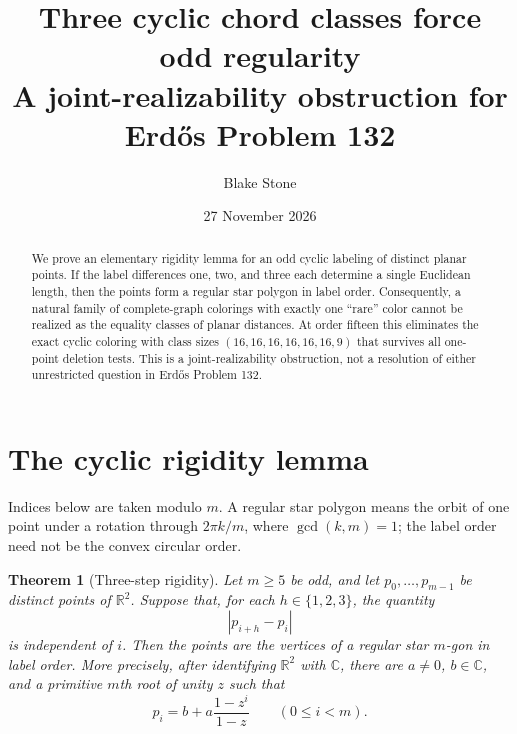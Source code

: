 \documentclass[11pt]{article}
\title{Three cyclic chord classes force odd regularity\\
\large A joint-realizability obstruction for Erd\H{o}s Problem 132}
\author{Blake Stone}
\date{27 November 2026}
\newtheorem{theorem}{Theorem}
\newcommand{\R}{\mathbb R}
\begin{document}
\maketitle

\begin{abstract}
We prove an elementary rigidity lemma for an odd cyclic labeling of distinct
planar points.  If the label differences one, two, and three each determine
a single Euclidean length, then the points form a regular star polygon in
label order.  Consequently, a natural family of complete-graph colorings
with exactly one ``rare'' color cannot be realized as the equality classes
of planar distances.  At order fifteen this eliminates the exact cyclic
coloring with class sizes $(16,16,16,16,16,16,9)$ that survives all
one-point deletion tests.  This is a joint-realizability obstruction, not a
resolution of either unrestricted question in Erd\H{o}s Problem 132.
\end{abstract}

\section{The cyclic rigidity lemma}

Indices below are taken modulo $m$.  A regular star polygon means the orbit
of one point under a rotation through $2\pi k/m$, where $\gcd(k,m)=1$;
the label order need not be the convex circular order.

\begin{theorem}[Three-step rigidity]\label{thm:rigidity}
Let $m\ge5$ be odd, and let $p_0,\ldots,p_{m-1}$ be distinct points of
$\R^2$.  Suppose that, for each $h\in\{1,2,3\}$, the quantity
\[
  |p_{i+h}-p_i|
\]
is independent of $i$.  Then the points are the vertices of a regular star
$m$-gon in label order.  More precisely, after identifying $\R^2$ with
$\mathbb C$, there are $a\ne0$, $b\in\mathbb C$, and a primitive $m$th
root of unity $z$ such that
\[
  p_i=b+a\frac{1-z^i}{1-z}\qquad(0\le i<m).
\]
\end{theorem}
\end{document}
